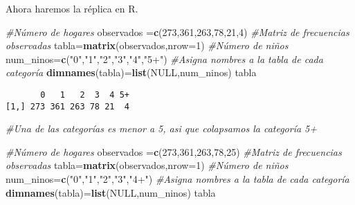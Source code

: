 \documentclass[
  a4paper,
  oneside,
  openany]{book}
\newenvironment{Shaded}{\begin{snugshade}}{\end{snugshade}}
\newcommand{\AttributeTok}[1]{\textcolor[rgb]{0.13,0.29,0.53}{#1}}
\newcommand{\CommentTok}[1]{\textcolor[rgb]{0.56,0.35,0.01}{\textit{#1}}}
\newcommand{\ConstantTok}[1]{\textcolor[rgb]{0.56,0.35,0.01}{#1}}
\newcommand{\DecValTok}[1]{\textcolor[rgb]{0.00,0.00,0.81}{#1}}
\newcommand{\FunctionTok}[1]{\textcolor[rgb]{0.13,0.29,0.53}{\textbf{#1}}}
\newcommand{\NormalTok}[1]{#1}
\newcommand{\OtherTok}[1]{\textcolor[rgb]{0.56,0.35,0.01}{#1}}
\newcommand{\StringTok}[1]{\textcolor[rgb]{0.31,0.60,0.02}{#1}}
\begin{document}
Ahora haremos la réplica en R.

\begin{Shaded}
\begin{Highlighting}[]
\CommentTok{\#Número de hogares}
\NormalTok{observados }\OtherTok{=}\FunctionTok{c}\NormalTok{(}\DecValTok{273}\NormalTok{,}\DecValTok{361}\NormalTok{,}\DecValTok{263}\NormalTok{,}\DecValTok{78}\NormalTok{,}\DecValTok{21}\NormalTok{,}\DecValTok{4}\NormalTok{) }
\CommentTok{\#Matriz de frecuencias observadas}
\NormalTok{tabla}\OtherTok{=}\FunctionTok{matrix}\NormalTok{(observados,}\AttributeTok{nrow=}\DecValTok{1}\NormalTok{)}
\CommentTok{\#Número de niños}
\NormalTok{num\_ninos}\OtherTok{=}\FunctionTok{c}\NormalTok{(}\StringTok{"0"}\NormalTok{,}\StringTok{"1"}\NormalTok{,}\StringTok{"2"}\NormalTok{,}\StringTok{"3"}\NormalTok{,}\StringTok{"4"}\NormalTok{,}\StringTok{"5+"}\NormalTok{)}
\CommentTok{\#Asigna nombres a la tabla de cada categoría}
\FunctionTok{dimnames}\NormalTok{(tabla)}\OtherTok{=}\FunctionTok{list}\NormalTok{(}\ConstantTok{NULL}\NormalTok{,num\_ninos)}
\NormalTok{tabla}
\end{Highlighting}
\end{Shaded}

\begin{verbatim}
       0   1   2  3  4 5+
[1,] 273 361 263 78 21  4
\end{verbatim}

\begin{Shaded}
\begin{Highlighting}[]
\CommentTok{\#Una de las categorías es menor a 5, asi que colapsamos la categoría 5+}

\CommentTok{\#Número de hogares}
\NormalTok{observados }\OtherTok{=}\FunctionTok{c}\NormalTok{(}\DecValTok{273}\NormalTok{,}\DecValTok{361}\NormalTok{,}\DecValTok{263}\NormalTok{,}\DecValTok{78}\NormalTok{,}\DecValTok{25}\NormalTok{)}
\CommentTok{\#Matriz de frecuencias observadas}
\NormalTok{tabla}\OtherTok{=}\FunctionTok{matrix}\NormalTok{(observados,}\AttributeTok{nrow=}\DecValTok{1}\NormalTok{)}
\CommentTok{\#Número de niños}
\NormalTok{num\_ninos}\OtherTok{=}\FunctionTok{c}\NormalTok{(}\StringTok{"0"}\NormalTok{,}\StringTok{"1"}\NormalTok{,}\StringTok{"2"}\NormalTok{,}\StringTok{"3"}\NormalTok{,}\StringTok{"4+"}\NormalTok{)}
\CommentTok{\#Asigna nombres a la tabla de cada categoría}
\FunctionTok{dimnames}\NormalTok{(tabla)}\OtherTok{=}\FunctionTok{list}\NormalTok{(}\ConstantTok{NULL}\NormalTok{,num\_ninos)}
\NormalTok{tabla}
\end{Highlighting}
\end{Shaded}
\end{document}
